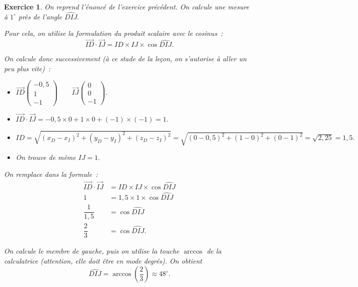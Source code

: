 \documentclass[10pt]{article}
\newtheorem{exo}{Exercice}
\begin{document}
\begin{exo}

On reprend l'énoncé de l'exercice précédent. On calcule une mesure à $1^{\circ}$ près de l'angle $\widehat{DIJ}.$

\medskip

Pour cela, on utilise la formulation du produit scalaire avec le cosinus~:
\[\overrightarrow{ID}\cdot\overrightarrow{IJ}=ID\times IJ\times \cos\widehat{DIJ}.\]

On calcule donc successivement (à ce stade de la leçon, on s'autorise à aller un peu plus vite)~:

\medskip
\begin{itemize}
\item[\textbullet] $\overrightarrow{ID}\begin{pmatrix} -0,5\\1\\-1\end{pmatrix}\qquad \overrightarrow{IJ}\begin{pmatrix} 0\\0\\-1\end{pmatrix}.$
\medskip
\item[\textbullet] $\overrightarrow{ID}\cdot\overrightarrow{IJ}=-0,5\times 0+1\times 0+(-1)\times (-1)=1.$
\medskip
\item[\textbullet] $ID=\sqrt{\left(x_D-x_I\right)^2+\left(y_D-y_I\right)^2+\left(z_D-z_I\right)^2}=\sqrt{(0-0,5)^2+(1-0)^2+(0-1)^2}=\sqrt{2,25}=1,5.$
\medskip
\item[\textbullet] On trouve de même $IJ=1.$
\end{itemize}

\medskip

On remplace dans la formule~:
\begin{align*}
\overrightarrow{ID}\cdot\overrightarrow{IJ}&=ID\times IJ\times \cos\widehat{DIJ}\\
1&=1,5\times 1\times \cos\widehat{DIJ}\\
\dfrac{1}{1,5}&=\cos\widehat{DIJ}\\
\dfrac{2}{3}&=\cos\widehat{DIJ}.
\end{align*}

On calcule le membre de gauche, puis on utilise la touche $\arccos$ de la calculatrice (attention, elle doit être en mode degrés). On obtient
\[\widehat{DIJ}=\arccos\left(\dfrac{2}{3}\right)\approx 48^{\circ}.\]

\end{exo}
\end{document}
